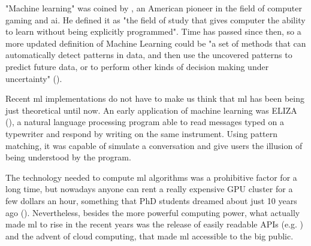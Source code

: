 "Machine learning" was coined by \cite{ml_first_def}, an American pioneer in the field of computer gaming and \gls{ai}. He defined it as "the field of study that gives computer the ability to learn without being explicitly programmed". Time has passed since then, so a more updated definition of Machine Learning could be "a set of methods that can automatically detect patterns in data, and then use the uncovered patterns to predict future
data, or to perform other kinds of decision making under uncertainty" (\cite{kevin_p_murphy_book}).

Recent \gls{ml} implementations do not have to make us think that \gls{ml} has been being just theoretical until now. An early application of machine learning was ELIZA (\cite{eliza_machine}), a natural language processing program able to read messages typed on a typewriter and respond by writing on the same instrument. Using pattern matching, it was capable of simulate a conversation and give users the illusion of being understood by the program.  

The technology needed to compute \gls{ml} algorithms was a prohibitive factor for a long time, but nowadays anyone can rent a really expensive GPU cluster for a few dollars an hour, something that PhD students dreamed about just 10 years ago (\cite{pyhton_n_intro_to_ML}). Nevertheless, besides the more powerful computing power, what actually made \gls{ml} to rise in the recent years was the release of easily readable APIs (e.g. \cite{tensorflow_main_website}) and the advent of cloud computing, that made \gls{ml} accessible to the big public.

